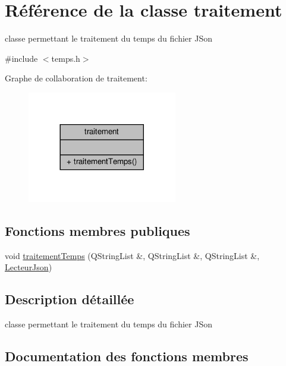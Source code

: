 \hypertarget{classtraitement}{}\section{Référence de la classe traitement}
\label{classtraitement}


classe permettant le traitement du temps du fichier J\+Son  




{\ttfamily \#include $<$temps.\+h$>$}



Graphe de collaboration de traitement\+:
\nopagebreak
\begin{figure}[H]
\begin{center}
\leavevmode
\includegraphics[width=185pt]{classtraitement__coll__graph}
\end{center}
\end{figure}
\subsection*{Fonctions membres publiques}
\begin{DoxyCompactItemize}
\item 
void \hyperlink{classtraitement_a2bc46fa58a25e3f3bf87dfc4fd08ebf8}{traitement\+Temps} (Q\+String\+List \&, Q\+String\+List \&, Q\+String\+List \&, \hyperlink{class_lecteur_json}{Lecteur\+Json})
\end{DoxyCompactItemize}


\subsection{Description détaillée}
classe permettant le traitement du temps du fichier J\+Son 

\subsection{Documentation des fonctions membres}
\mbox{\label{classtraitement_a2bc46fa58a25e3f3bf87dfc4fd08ebf8}} 
